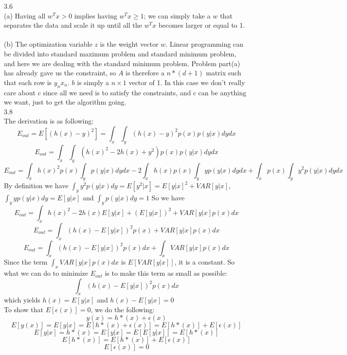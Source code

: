 \documentclass[12pt]{article}
\begin{document}
3.6\\
(a) Having all $w^Tx>0$ implies having $w^Tx\geq 1$; we can simply take a $w$ that separates the data and scale it up until all the $w^Tx$ becomes larger or equal to 1.\\\\
(b) The optimization variable $z$ is the weight vector $w$. Linear programming can be divided into standard maximum problem and standard minimum problem, and here we are dealing with the standard minimum problem. Problem part(a) has already gave us the constraint, so $A$ is therefore a $n*(d+1)$ matrix such that each row is $y_nx_n$. $b$ is simply a $n\times 1$ vector of 1. In this case we don't really care about $c$ since all we need is to satisfy the constraints, and $c$ can be anything we want, just to get the algorithm going. \\

3.8\\%
	The derivation is as following:
	$$E_{out}=E[(h(x)-y)^2]=\int_x\int_y(h(x)-y)^2p(x)p(y|x)dydx$$
	$$E_{out}=\int_x\int_y(h(x)^2-2h(x)+y^2)p(x)p(y|x)dydx$$
	$$E_{out}=\int_xh(x)^2p(x)\int_yp(y|x)dydx-2\int_xh(x)p(x)\int_yyp(y|x)dydx+\int_xp(x)\int_yy^2p(y|x)dydx$$
	By definition we have $\int_yy^2p(y|x)dy=E[y^2|x]=E[y|x]^2+VAR[y|x]$,$\int_yyp(y|x)dy=E[y|x]$ and $\int_yp(y|x)dy=1$
	So we have
	$$E_{out}=\int_xh(x)^2-2h(x)E[y|x]+(E[y|x])^2+VAR[y|x]p(x)dx$$
	$$E_{out}=\int_x(h(x)-E[y|x])^2p(x)+VAR[y|x]p(x)dx$$
	$$E_{out}=\int_x(h(x)-E[y|x])^2p(x)dx+\int_xVAR[y|x]p(x)dx$$
	Since the term $\int_xVAR[y|x]p(x)dx$ is $E[VAR[y|x]]$, it is a constant. So what we can do to minimize $E_{out}$ is to make this term as small as possible:$$\int_x(h(x)-E[y|x])^2p(x)dx$$ which yields $h(x)=E[y|x]$ and $h(x)-E[y|x]=0$\\
	To show that $E[\epsilon(x)]=0$, we do the following:
	$$y(x)=h*(x)+\epsilon(x)$$
	$$E[y(x)]=E[y|x]=E[h*(x)+\epsilon(x)]=E[h*(x)]+E[\epsilon(x)]$$
	$$E[y|x]=h*(x)=E[y|x]=E[E[y|x]]=E[h*(x)]$$
	$$E[h*(x)]=E[h*(x)]+E[\epsilon(x)]$$
	$$E[\epsilon(x)]=0$$
\end{document}
